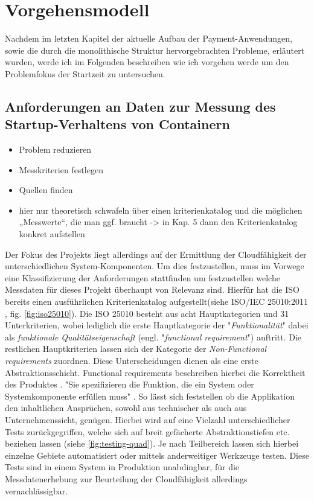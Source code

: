 \chapter{Vorgehensmodell}

Nachdem im letzten Kapitel der aktuelle Aufbau der Payment-Anwendungen, sowie die durch die monolithische Struktur hervorgebrachten Probleme, erläutert wurden, werde ich im Folgenden beschreiben wie ich vorgehen werde um den Problemfokus der Startzeit zu untersuchen.

\section{Anforderungen an Daten zur Messung des Startup-Verhaltens von Containern}
\label{sec:startupAnforderungen}

\begin{itemize}
  \item Problem reduzieren
  \item Messkriterien festlegen
  \item Quellen finden
  \item hier nur theoretisch schwafeln über einen kriterienkatalog und die möglichen „Messwerte“, die man ggf. braucht -> in Kap. 5 dann den Kriterienkatalog konkret aufstellen
\end{itemize}

Der Fokus des Projekts liegt allerdings auf der Ermittlung der Cloudfähigkeit der unterschiedlichen System-Komponenten. Um dies festzustellen, muss im Vorwege eine Klassifizierung der Anforderungen stattfinden um festzustellen welche Messdaten für dieses Projekt überhaupt von Relevanz sind. Hierfür hat die ISO bereits einen ausführlichen Kriterienkatalog aufgestellt(siehe ISO/IEC 25010:2011 \cite{iso25010}, fig. \ref{fig:iso25010}). Die ISO 25010 besteht aus acht Hauptkategorien und 31 Unterkriterien, wobei lediglich die erste Hauptkategorie der "\emph{Funktionalität}" dabei als \emph{funktionale Qualitätseigenschaft} (engl. "\emph{functional requirement}") auftritt. Die restlichen Hauptkriterien lassen sich der Kategorie der \emph{Non-Functional requirements} zuordnen. Diese Unterscheidungen dienen als eine erste Abstraktionsschicht. Functional requirements beschreiben hierbei die Korrektheit des Produktes \cite{continuous-delivery}. "Sie spezifizieren die Funktion, die ein System oder Systemkomponente erfüllen muss" \cite{eide-requirements}. So lässt sich feststellen ob die Applikation den inhaltlichen Ansprüchen, sowohl aus technischer als auch aus Unternehmenssicht, genügen. Hierbei wird auf eine Vielzahl unterschiedlicher Tests zurückgegriffen, welche sich auf breit gefächerte Abstraktionstiefen etc. beziehen lassen (siehe \ref{fig:testing-quad}). Je nach Teilbereich lassen sich hierbei einzelne Gebiete automatisiert oder mittels anderweitiger Werkzeuge testen. Diese Tests sind in einem System in Produktion unabdingbar, für die Messdatenerhebung zur Beurteilung der Cloudfähigkeit allerdings vernachlässigbar. 


